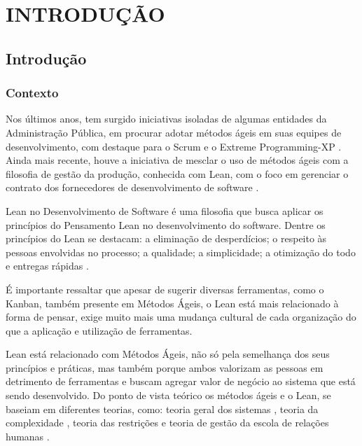 \part{INTRODUÇÃO}

\chapter[Introdução]{Introdução}



\section[Contexto]{Contexto}

Nos últimos anos, tem surgido iniciativas isoladas de algumas entidades da Administração Pública, em procurar adotar métodos ágeis em suas equipes de desenvolvimento, com destaque para o Scrum e o Extreme Programming-XP \cite{TCU:2013} \cite{RTMAC}.  Ainda mais recente, houve a iniciativa de mesclar o uso de métodos ágeis com a filosofia de gestão da produção, conhecida com Lean, com o foco em gerenciar o contrato dos fornecedores de desenvolvimento de software \cite{agilebrazil}. 

Lean no Desenvolvimento de Software é uma filosofia que busca aplicar os princípios do Pensamento Lean no desenvolvimento do software. Dentre os princípios do Lean se destacam: a eliminação de desperdícios; o respeito às pessoas envolvidas no processo; a qualidade; a simplicidade; a otimização do todo e entregas rápidas \cite{poppendieck}.

É importante ressaltar que apesar de sugerir diversas ferramentas, como o Kanban, também presente em Métodos Ágeis, o Lean está mais relacionado à forma de pensar, exige muito mais uma mudança cultural de cada organização do que a aplicação e utilização de ferramentas. 

Lean está relacionado com Métodos Ágeis, não só pela semelhança dos seus princípios e práticas, mas também porque ambos valorizam as pessoas em detrimento de ferramentas e buscam agregar valor de negócio ao sistema que está sendo desenvolvido. Do ponto de vista teórico os métodos ágeis e o Lean, se baseiam em diferentes teorias, como: teoria geral dos sistemas \cite{sistemas}, teoria da complexidade \cite{complexidade}, teoria das restrições \cite{katayama2010} e teoria de gestão da escola de relações humanas \cite{administracao}. 

